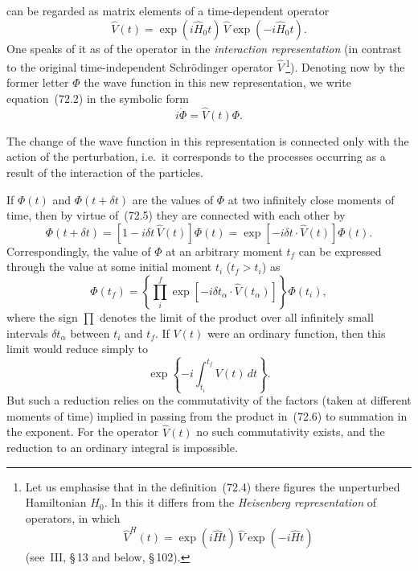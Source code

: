 can be regarded as matrix elements of a time-dependent operator
\begin{equation}
\hat{V}(t) = \exp(i\hat{H}_0 t)\,\hat{V}\exp(-i\hat{H}_0 t).
\tag{72.4}
\end{equation}
One speaks of it as of the operator in the \textit{interaction representation} (in contrast to the original time-independent Schr\"{o}dinger operator $\hat{V}$\,\footnote{Let us emphasise that in the definition~(72.4) there figures the unperturbed Hamiltonian $H_0$. In this it differs from the \textit{Heisenberg representation} of operators, in which
\[
\hat{V}^H(t) = \exp(i\hat{H}t)\,\hat{V}\exp(-i\hat{H}t)
\]
(see~III, \S\,13 and below, \S\,102).}). Denoting now by the former letter $\Phi$ the wave function in this new representation, we write equation~(72.2) in the symbolic form
\begin{equation}
i\dot{\Phi} = \hat{V}(t)\Phi.
\tag{72.5}
\end{equation}

The change of the wave function in this representation is connected only with the action of the perturbation, i.e.\ it corresponds to the processes occurring as a result of the interaction of the particles.

If $\Phi(t)$ and $\Phi(t + \delta t)$ are the values of $\Phi$ at two infinitely close moments of time, then by virtue of~(72.5) they are connected with each other by
\[
\Phi(t + \delta t) = [1 - i\delta t\,\hat{V}(t)]\Phi(t) = \exp[-i\delta t \cdot \hat{V}(t)]\Phi(t).
\]
Correspondingly, the value of $\Phi$ at an arbitrary moment $t_f$ can be expressed through the value at some initial moment $t_i$ ($t_f > t_i$) as
\begin{equation}
\Phi(t_f) = \left\{\prod_i^f\exp[-i\delta t_\alpha\cdot\hat{V}(t_\alpha)]\right\}\Phi(t_i),
\tag{72.6}
\end{equation}
where the sign $\prod$ denotes the limit of the product over all infinitely small intervals $\delta t_\alpha$ between $t_i$ and $t_f$. If $V(t)$ were an ordinary function, then this limit would reduce simply to
\[
\exp\left\{-i\int_{t_i}^{t_f}V(t)\,dt\right\}.
\]
But such a reduction relies on the commutativity of the factors (taken at different moments of time) implied in passing from the product in~(72.6) to summation in the exponent. For the operator $\hat{V}(t)$ no such commutativity exists, and the reduction to an ordinary integral is impossible.

